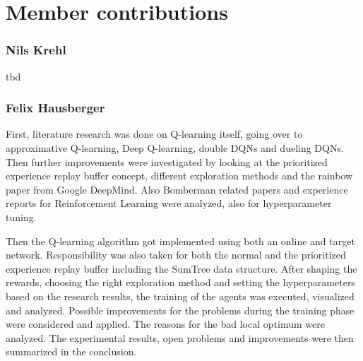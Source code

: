 \section*{Member contributions}

\subsubsection*{Nils Krehl}
tbd

\subsubsection*{Felix Hausberger}

First, literature research was done on Q-learning itself, going over to approximative Q-learning, Deep Q-learning, double DQNs and dueling DQNs. Then further improvements were investigated by looking at the prioritized experience replay buffer concept, different exploration methods and the rainbow paper from Google DeepMind. Also Bomberman related papers and experience reports for Reinforcement Learning were analyzed, also for hyperparameter tuning. 

Then the Q-learning algorithm got implemented using both an online and target network. Responsibility was also taken for both the normal and the prioritized experience replay buffer including the SumTree data structure. After shaping the rewards, choosing the right exploration method and setting the hyperparameters based on the research results, the training of the agents was executed, visualized and analyzed. Possible improvements for the problems during the training phase were considered and applied. The reasons for the bad local optimum were analyzed. The experimental results, open problems and improvements were then summarized in the conclusion.
